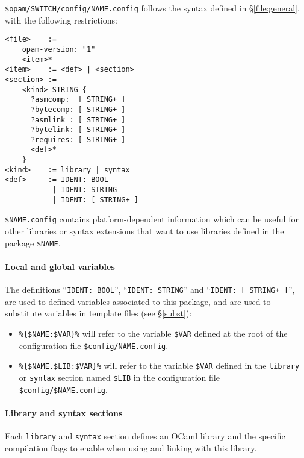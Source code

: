 \documentclass[a4paper,11pt]{article}
\begin{document}
\verb+$opam/SWITCH/config/NAME.config+ follows the syntax defined in
\S\ref{file:general}, with the following restrictions:

{\small
\begin{Verbatim}[frame=single]
<file>    :=
    opam-version: "1"
    <item>*
<item>    := <def> | <section>
<section> :=
    <kind> STRING {
      ?asmcomp:  [ STRING+ ]
      ?bytecomp: [ STRING+ ]
      ?asmlink : [ STRING+ ]
      ?bytelink: [ STRING+ ]
      ?requires: [ STRING+ ]
      <def>*
    }
<kind>    := library | syntax
<def>     := IDENT: BOOL
           | IDENT: STRING
           | IDENT: [ STRING+ ]
\end{Verbatim}
}

\verb+$NAME.config+ contains platform-dependent information which can
be useful for other libraries or syntax extensions that want to use
libraries defined in the package \verb+$NAME+.

\paragraph{Local and global variables}

The definitions ``{\tt IDENT: BOOL}'', ``{\tt IDENT: STRING}'' and ``{\tt IDENT:
  [ STRING+ ]}'', are used to defined variables associated to this
package, and are used to substitute variables in template files (see
\S\ref{subst}):

\begin{itemize}

\item \verb+%{$NAME:$VAR}%+ will refer to the variable \verb+$VAR+
  defined at the root of the configuration file \verb+$config/NAME.config+.

\item \verb+%{$NAME.$LIB:$VAR}%+ will refer to the variable \verb+$VAR+
  defined in the {\tt library} or {\tt syntax} section named
  \verb+$LIB+ in the configuration file \verb+$config/$NAME.config+.

\end{itemize}

\paragraph{Library and syntax sections}

Each {\tt library} and {\tt syntax} section defines an OCaml library
and the specific compilation flags to enable when using and linking
with this library.
\end{document}

